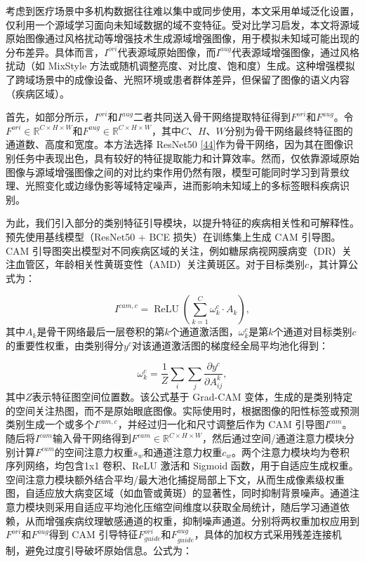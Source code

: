 
考虑到医疗场景中多机构数据往往难以集中或同步使用，本文采用单域泛化设置，仅利用一个源域学习面向未知域数据的域不变特征。受对比学习启发，本文将源域原始图像通过风格扰动等增强技术生成源域增强图像，用于模拟未知域可能出现的分布差异。具体而言，\(I^{ori}\)代表源域原始图像，而\(I^{aug}\)代表源域增强图像，通过风格扰动（如 MixStyle 方法或随机调整亮度、对比度、饱和度）生成。这种增强模拟了跨域场景中的成像设备、光照环境或患者群体差异，但保留了图像的语义内容（疾病区域）。

首先，如部分所示，\(I^{ori}\)和\(I^{aug}\)二者共同送入骨干网络提取特征得到\(F^{ori}\)和\(F^{aug}\)。令\(F^{ori} \in \mathbb{R}^{C \times H \times W}\)和\(F^{aug} \in \mathbb{R}^{C \times H \times W}\)，其中\(C\)、\(H\)、\(W\)分别为骨干网络最终特征图的通道数、高度和宽度。本方法选择 ResNet50 \hyperref[_RefResNet2016]{{[}44{]}}作为骨干网络，因为其在图像识别任务中表现出色，具有较好的特征提取能力和计算效率。然而，仅依靠源域原始图像与源域增强图像之间的对比约束作用仍然有限，模型可能同时学习到背景纹理、光照变化或边缘伪影等域特定噪声，进而影响未知域上的多标签眼科疾病识别。

为此，我们引入部分的类别特征引导模块，以提升特征的疾病相关性和可解释性。预先使用基线模型（ResNet50 + BCE 损失）在训练集上生成 CAM 引导图。CAM 引导图突出模型对不同疾病区域的关注，例如糖尿病视网膜病变（DR）关注血管区，年龄相关性黄斑变性（AMD）关注黄斑区。对于目标类别\(c\)，其计算公式为：

\begin{equation}\label{eq:cam}
I^{cam,c} = \operatorname{ReLU}\left(\sum_{k = 1}^{C}\omega_{k}^{c} \cdot A_{k}\right),
\end{equation}
其中\(A_{k}\)是骨干网络最后一层卷积的第\(k\)个通道激活图，\(\omega_{k}^{c}\)是第\(k\)个通道对目标类别\(c\)的重要性权重，由类别得分\(y^{c}\)对该通道激活图的梯度经全局平均池化得到：

\begin{equation}\label{eq:cam-weight}
\omega_{k}^{c} = \frac{1}{Z}\sum_i\sum_j \frac{\partial y^{c}}{\partial A_{ij}^{k}},
\end{equation}
其中\(Z\)表示特征图空间位置数。该公式基于 Grad-CAM 变体，生成的是类别特定的空间关注热图，而不是原始眼底图像。实际使用时，根据图像的阳性标签或预测类别生成一个或多个\(I^{cam,c}\)，并经过归一化和尺寸调整后作为 CAM 引导图\(I^{cam}\)。随后将\(I^{cam}\)输入骨干网络得到\(F^{cam} \in \mathbb{R}^{C \times H \times W}\)，然后通过空间/通道注意力模块分别计算\(F^{cam}\)的空间注意力权重\(s_{w}\)和通道注意力权重\(c_{w}\)。两个注意力模块均为卷积序列网络，均包含1x1 卷积、ReLU 激活和 Sigmoid 函数，用于自适应生成权重。空间注意力模块额外结合平均/最大池化捕捉局部上下文，从而生成像素级权重图，自适应放大病变区域（如血管或黄斑）的显著性，同时抑制背景噪声。通道注意力模块则采用自适应平均池化压缩空间维度以获取全局统计，随后学习通道依赖，从而增强疾病纹理敏感通道的权重，抑制噪声通道。分别将两权重加权应用到\(F^{ori}\)和\(F^{aug}\)得到 CAM 引导特征\(F_{guide}^{ori}\)和\(F_{guide}^{aug}\)，具体的加权方式采用残差连接机制，避免过度引导破坏原始信息。公式为：

